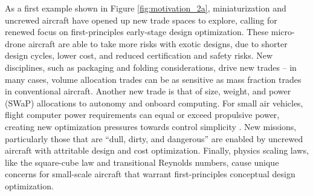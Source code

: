 \documentclass[12pt,vi,oneside]{report}
\begin{document}
    As a first example shown in Figure \ref{fig:motivation_2a}, miniaturization and uncrewed aircraft have opened up new trade spaces to explore, calling for renewed focus on first-principles early-stage design optimization. These micro-drone aircraft are able to take more risks with exotic designs, due to shorter design cycles, lower cost, and reduced certification and safety risks. New disciplines, such as packaging and folding considerations, drive new trades -- in many cases, volume allocation trades can be as sensitive as mass fraction trades in conventional aircraft. Another new trade is that of size, weight, and power (SWaP) allocations to autonomy and onboard computing. For small air vehicles, flight computer power requirements can equal or exceed propulsive power, creating new optimization pressures towards control simplicity \cite{sudhakar_balancing_2020}. New missions, particularly those that are ``dull, dirty, and dangerous'' are enabled by uncrewed aircraft with attritable design and cost optimization. Finally, physics scaling laws, like the square-cube law and transitional Reynolds numbers, cause unique concerns for small-scale aircraft that warrant first-principles conceptual design optimization.
\end{document}
